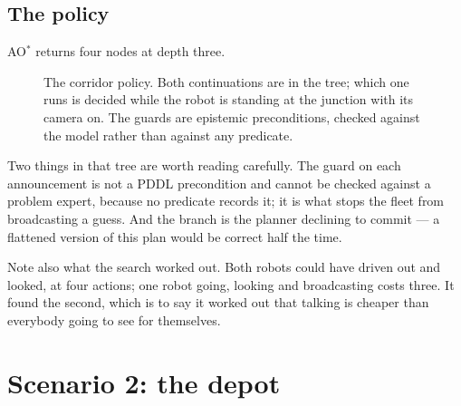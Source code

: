 \documentclass[11pt,a4paper]{article}
\newcommand{\blocked}{\mathit{blocked}}
\begin{document}
\subsection{The policy}

AO$^{*}$ returns four nodes at depth three.

\begin{figure}[H]
\centering
{}
\caption{The corridor policy. Both continuations are in the tree; which one runs
is decided while the robot is standing at the junction with its camera on. The
guards are epistemic preconditions, checked against the model rather than
against any predicate.}
\label{fig:corridor-policy}
\end{figure}

Two things in that tree are worth reading carefully. The guard on each
announcement is not a PDDL precondition and cannot be checked against a problem
expert, because no predicate records it; it is what stops the fleet from
broadcasting a guess. And the branch is the planner declining to commit --- a
flattened version of this plan would be correct half the time.

Note also what the search worked out. Both robots could have driven out and
looked, at four actions; one robot going, looking and broadcasting costs three.
It found the second, which is to say it worked out that talking is cheaper than
everybody going to see for themselves.

\section{Scenario 2: the depot}
\label{sec:depot}
\end{document}
